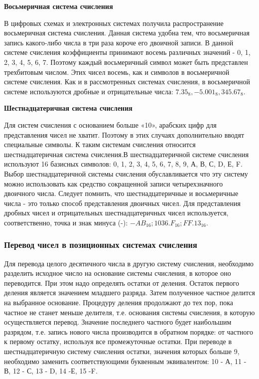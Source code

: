 \textbf{Восьмеричная система счисления}

В цифровых схемах и электронных системах получила распространение восьмеричная система счисления. Данная система удобна тем, что восьмеричная запись какого-либо числа в три раза короче его двоичной записи. В данной системе счисления коэффициенты принимают восемь различных значений - 0, 1, 2, 3, 4, 5, 6, 7.
Поэтому каждый восьмеричный символ может быть представлен трехбитовым числом. Этих чисел восемь, как и символов в восьмеричной системе счисления. Как и в рассмотренных системах счисления, в восьмеричной системе используются дробные и отрицательные числа: $7.35_{8},- 5.001_{8}, 345.67_{8}$.

\textbf{Шестнадцатеричная система счисления}

Для систем счисления с основанием больше «10», арабских цифр для представления чисел не хватит. Поэтому в этих случаях дополнительно вводят специальные символы. К таким системам счисления относится шестнадцатеричная система счисления.В шестнадцатеричной системе счисления используют 16 базисных символов: 0, 1, 2, 3, 4, 5, 6, 7, 8, 9, А, В, С, D, Е, F. Выбор шестнадцатеричной системы счисления обуславливается что эту систему можно использовать как средство сокращенной записи четырехзначного двоичного числа. Следует помнить, что шестнадцатеричные и восьмеричные числа - это только способ представления двоичных чисел. Для представления дробных чисел и отрицательных шестнадцатеричных чисел используется, соответственно, точка и знак минуса (-): $-AB_{16}; 1036.F_{16};FF.13_{16}$.

\subsubsection{Перевод чисел в позиционных системах счисления}

Для перевода целого десятичного числа в другую систему счисления, необходимо разделить исходное число на основание системы счисления, в которое оно переводится. При этом надо определять остатки от деления. Остаток первого деления является значением младшего разряда. Затем полученное частное делится на выбранное основание. Процедуру деления продолжают до тех пор, пока частное не станет меньше делителя, т.е. основания системы счисления, в которую осуществляется перевод. Значение последнего частного будет наибольшим разрядом, т.е. запись нового числа производится в обратном порядке: от частного к первому остатку, используя все промежуточные остатки. При переводе в шестнадцатеричную систему счисления остатки, значения которых больше 9, необходимо заменить соответствующими буквенным эквивалентом: 10 - А, 11 - В, 12 - С, 13 - D, 14 -Е, 15 -F.

